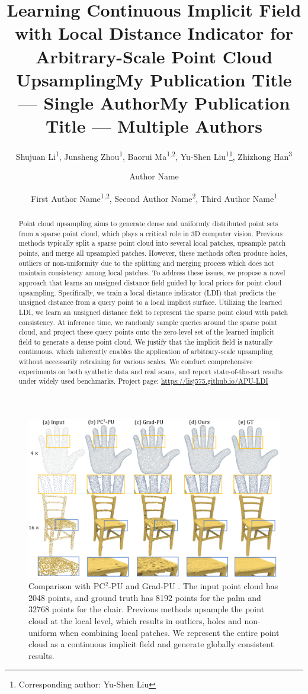 \documentclass[letterpaper]{article} %
\title{Learning Continuous Implicit Field with Local Distance Indicator for Arbitrary-Scale Point Cloud Upsampling}
\author{
    Shujuan Li\textsuperscript{\rm 1}\equalcontrib,
    Junsheng Zhou\textsuperscript{\rm 1}\equalcontrib,
    Baorui Ma\textsuperscript{\rm 1,2},
    Yu-Shen Liu\textsuperscript{\rm 1}\thanks{Corresponding author: Yu-Shen Liu},
    Zhizhong Han\textsuperscript{\rm 3}
}
\title{My Publication Title --- Single Author}
\author {
    Author Name
}
\title{My Publication Title --- Multiple Authors}
\author {
    First Author Name\textsuperscript{\rm 1,\rm 2},
    Second Author Name\textsuperscript{\rm 2},
    Third Author Name\textsuperscript{\rm 1}
}
\begin{document}
\maketitle
\begin{abstract}
Point cloud upsampling aims to generate dense and uniformly distributed point sets from a sparse point cloud, which plays a critical role in 3D computer vision. Previous methods typically split a sparse point cloud into several local patches, upsample patch points, and merge all upsampled patches. However, these methods often produce holes, outliers or non-uniformity due to the splitting and merging process which does not maintain consistency among local patches.
To address these issues, we propose a novel approach that learns an unsigned distance field guided by local priors for point cloud upsampling. Specifically, we train a local distance indicator (LDI) that predicts the unsigned distance from a query point to a local implicit surface. Utilizing the learned LDI, we learn an unsigned distance field to represent the sparse point cloud with patch consistency. At inference time, we randomly sample queries around the sparse point cloud, and project these query points onto the zero-level set of the learned implicit field to generate a dense point cloud.
We justify that the implicit field is naturally continuous, which inherently enables the application of arbitrary-scale upsampling without necessarily retraining for various scales. We conduct comprehensive experiments on both synthetic data and real scans, and report state-of-the-art results under widely used benchmarks. Project page: \url{https://lisj575.github.io/APU-LDI}
\end{abstract}

\begin{figure}
\centering
\includegraphics[width=0.95\linewidth]{methods_compare.pdf}
\caption{Comparison with PC$^2$-PU \cite{long2022pc2} and Grad-PU \cite{he2023grad}. The input point cloud has 2048 points, and ground truth has 8192 points for the palm and 32768 points for the chair. Previous methods upsample the point cloud at the local level, which results in outliers, holes and non-uniform when combining local patches. We represent the entire point cloud as a continuous implicit field and generate globally consistent results.}
\label{fig:methods_cpmparison}
\end{figure}
\end{document}
